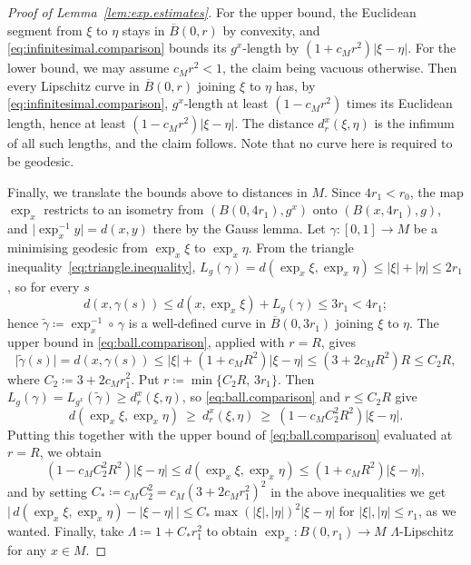 \documentclass[10pt,a4paper]{amsart}
\begin{document}
\begin{proof}[Proof of Lemma~\ref{lem:exp.estimates}]
    For the upper bound, the Euclidean segment from \( \xi \) to \( \eta \) stays in \( \overline B(0,r) \) by convexity, and \eqref{eq:infinitesimal.comparison} bounds its \( g^x \)-length by \( (1+c_Mr^2)\lvert\xi-\eta\rvert \). 
    For the lower bound, we may assume \( c_Mr^2<1 \), the claim being vacuous otherwise.
    Then every Lipschitz curve in \( \overline B(0,r) \) joining \( \xi \) to \( \eta \) has, by \eqref{eq:infinitesimal.comparison}, \( g^x \)-length at least \( (1-c_Mr^2) \) times its Euclidean length, hence at least \( (1-c_Mr^2)\lvert\xi-\eta\rvert \).
    The distance \(d^x_r(\xi,\eta)\) is the infimum of all such lengths, and the claim follows.  
    Note that no curve here is required to be geodesic.
 
    Finally, we translate the bounds above to distances in \(M\).
    Since \( 4r_1<r_0 \), the map \( \exp_x \) restricts to an isometry from \( \left(B(0,4r_1),g^x\right) \) onto \( \left(B(x,4r_1),g\right) \), and \( \lvert\exp_x^{-1}y\rvert=d(x,y) \) there by the Gauss lemma.
    Let \( \gamma:[0,1]\to M \) be a minimising geodesic from \( \exp_x\xi \) to \( \exp_x\eta \).    
    From the triangle inequality~\eqref{eq:triangle.inequality}, \( L_g(\gamma)=d(\exp_x\xi,\exp_x\eta)\le\lvert\xi\rvert+\lvert\eta\rvert\le2r_1 \), so for every \( s \)
    \[
        d\left(x,\gamma(s)\right)\le d(x,\exp_x\xi)+L_g(\gamma)\le3r_1<4r_1 ;
    \]
    hence \( \widetilde\gamma\coloneqq \exp_x^{-1}\circ\,\gamma \) is a well-defined curve in \( \overline B(0,3r_1) \) joining \( \xi \) to \( \eta \).  
    The upper bound in \eqref{eq:ball.comparison}, applied with \( r=R \), gives
    \[
        \lvert\widetilde\gamma(s)\rvert=d\left(x,\gamma(s)\right)
        \le\lvert\xi\rvert+\left(1+c_MR^2\right)\lvert\xi-\eta\rvert
        \le\left(3+2c_MR^2\right)R\le C_2R,
    \]
    where \( C_2\coloneqq 3+2c_Mr_1^2 \).
    Put \( r\coloneqq \min\{C_2R,\,3r_1\} \).  
    Then \( L_g(\gamma) = L_{g^x}(\widetilde\gamma) \ge d^x_r(\xi,\eta) \), so \eqref{eq:ball.comparison} and \( r\le C_2R \) give
    \[
        d(\exp_x\xi,\exp_x\eta)\ \ge\ d^x_r(\xi,\eta)
        \ \ge\ \left(1-c_MC_2^2R^2\right)\lvert\xi-\eta\rvert .
    \]
    Putting this together with the upper bound of \eqref{eq:ball.comparison} evaluated at \( r=R \), we obtain
    \[
        \left(1-c_MC_2^2R^2\right)\lvert\xi-\eta\rvert \le d(\exp_x\xi,\exp_x\eta)\le (1+c_MR^2)\lvert\xi-\eta\rvert,
    \]  
    and by setting \( C_\ast\coloneqq c_MC_2^2=c_M(3+2c_Mr_1^2)^2 \) in the above inequalities we get \( \big\lvert\,d(\exp_x\xi,\exp_x\eta)-\lvert\xi-\eta\rvert\,\big\rvert \le C_\ast\max(\lvert\xi\rvert,\lvert\eta\rvert)^2\lvert\xi-\eta\rvert \) for \(\lvert \xi \rvert, \lvert \eta\rvert \le r_1\), as we wanted.
    Finally, take \(\Lambda\coloneqq 1+C_\ast r_1^2\) to obtain \(\exp_x: B(0, r_1) \to M\) \(\Lambda\)-Lipschitz for any \(x\in M\).
\end{proof}
\end{document}
